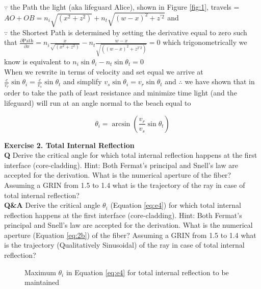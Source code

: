 \documentclass[main.tex]{subfiles}
\begin{document}
$\because$ the Path the light  (aka lifeguard Alice), shown in Figure \ref{fig:1},  travels  = $AO + OB = n_i \sqrt{(x^2 + z^2)} + n_t \sqrt{(w-x)^2 +  z^{\prime 2}}$ and\\

$\because$ the Shortest Path is determined by setting the derivative equal to zero such that $ \frac{\partial \text{Path}}{\partial x} = n_i \frac{x}{\sqrt{(x^2 + z^2)}} - n_t \frac{w-x}{\sqrt{((w-x)^2 + z^{2\prime 2})}} = 0$ which trigonometrically we know is equivalent to $n_i \sin{\theta_i} - n_t \sin{\theta_t} = 0$\\

When we rewrite in terms of velocity and set equal we arrive at $\frac{c}{v_r}\sin{\theta_i} = \frac{c}{v_s} \sin{\theta_t}$ and simplify $v_s\sin{\theta_i} = {v_r}\sin{\theta_t}$ and $\therefore$ we have shown that in order to take the path of least resistance and minimize time light (and the lifeguard) will run at an angle normal to the beach equal to 

\begin{equation}\label{sol1a}
\theta_i = \arcsin{(\frac{v_r}{v_s} \sin{\theta_t})}
\end{equation}

\textbf{Exercise 2. Total Internal Reflection}\\

\textbf{Q} Derive the critical angle for which total internal reflection happens at the first interface (core-cladding). Hint: Both Fermat's principal and Snell's law are accepted for the derivation. What is the numerical aperture of the fiber? Assuming a GRIN from 1.5 to 1.4 what is the trajectory of the ray in case of total internal reflection? \\

\textbf{Q\&A} Derive the critical angle $\theta_i$ (Equation \ref{eq:e4}) for which total internal reflection happens at the first interface (core-cladding). Hint: Both Fermat's principal and Snell's law are accepted for the derivation. What is the numerical aperture (Equation \ref{eq:2b}) of the fiber? Assuming a GRIN from 1.5 to 1.4 what is the trajectory (Qualitatively Sinusoidal) of the ray in case of total internal reflection? \\

\begin{figure}
\centering{}
\caption{Maximum $\theta_i$ in Equation \ref{eq:e4} for total internal reflection to be maintained}
\label{fig:2}
\end{figure}
\end{document}
